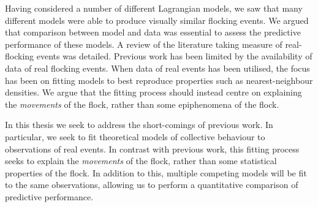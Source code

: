 Having considered a number of different Lagrangian models, we saw that many
different models were able to produce visually similar flocking events. We
argued that comparison between model and data was essential to assess the
predictive performance of these models. A review of the literature taking
measure of real-flocking events was detailed. Previous work has been limited by
the availability of data of real flocking events. When data of real events has
been utilised, the focus has been on fitting models to best reproduce
properties such as nearest-neighbour densities. We argue that the fitting
process should instead centre on explaining the \emph{movements} of the flock,
rather than some epiphenomena of the flock.

In this thesis we seek to address the short-comings of previous work. In
particular, we seek to fit theoretical models of collective behaviour to
observations of real events. In contrast with previous work, this fitting
process seeks to explain the \emph{movements} of the flock, rather than some
statistical properties of the flock. In addition to this, multiple competing
models will be fit to the same observations, allowing us to perform a
quantitative comparison of predictive performance.
